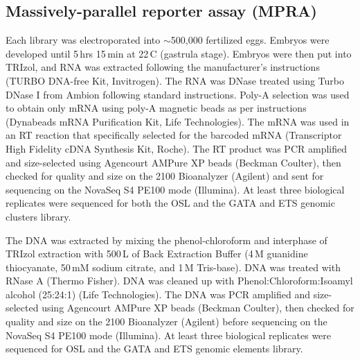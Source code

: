 \subsection{Massively-parallel reporter assay (MPRA)}
Each library was electroporated into $\sim$500,000 fertilized eggs. Embryos were developed until 5\,hrs 15\,min at 22\,\textdegree C (gastrula stage). Embryos were then put into TRIzol, and RNA was extracted following the manufacturer’s instructions (TURBO DNA-free Kit, Invitrogen). The RNA was DNase treated using Turbo DNase I from Ambion following standard instructions. Poly-A selection was used to obtain only mRNA using poly-A magnetic beads as per instructions (Dynabeads mRNA Purification Kit, Life Technologies). The mRNA was used in an RT reaction that specifically selected for the barcoded mRNA (Transcriptor High Fidelity cDNA Synthesis Kit, Roche). The RT product was PCR amplified and size-selected using Agencourt AMPure XP beads (Beckman Coulter), then checked for quality and size on the 2100 Bioanalyzer (Agilent) and sent for sequencing on the NovaSeq S4 PE100 mode (Illumina). At least three biological replicates were sequenced for both the OSL and the GATA and ETS genomic clusters library.

The DNA was extracted by mixing the phenol-chloroform and interphase of TRIzol extraction with 500\,\textmu L of Back Extraction Buffer (4\,M guanidine thiocyanate, 50\,mM sodium citrate, and 1\,M Tris-base). DNA was treated with RNase A (Thermo Fisher). DNA was cleaned up with Phenol:Chloroform:Isoamyl alcohol (25:24:1) (Life Technologies). The DNA was PCR amplified and size-selected using Agencourt AMPure XP beads (Beckman Coulter), then checked for quality and size on the 2100 Bioanalyzer (Agilent) before sequencing on the NovaSeq S4 PE100 mode (Illumina). At least three biological replicates were sequenced for OSL and the GATA and ETS genomic elements library.

